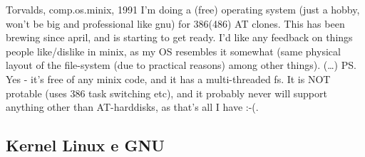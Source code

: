 \documentclass{beamer}
\begin{document}
\begin{frame}

  \begin{block}{Torvalds, comp.os.minix, 1991}
    \footnotesize{
      I'm doing a (free) operating system (just a hobby, won't be big and
      professional like gnu) for 386(486) AT clones.  This has been
      brewing since april, and is starting to get ready.  I'd like any
      feedback on things people like/dislike in minix, as my OS resembles
      it somewhat (same physical layout of the file-system (due to
      practical reasons) among other things).
      \newline
      \newline
      (\ldots)
      \newline
      \newline
      PS\@.  Yes - it's free of any minix code, and it has a
      multi-threaded fs. It is NOT protable (uses 386 task switching
      etc), and it probably never will support anything other than
      AT-harddisks, as that's all I have :-(. 
    }
  \end{block}

\end{frame}

\subsection{Kernel Linux e GNU}
\end{document}
